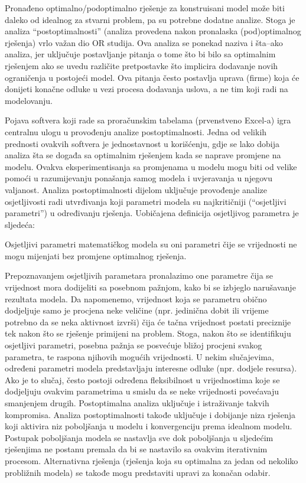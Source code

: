 \documentclass[a4paper, utf8, 11pt, colorlinks]{book}
\begin{document}
Pronađeno optimalno/podoptimalno rješenje za konstruisani model može biti daleko od idealnog za stvarni problem, pa su potrebne dodatne analize. Stoga je analiza ``postoptimalnosti'' (analiza provedena nakon pronalaska (pod)optimalnog rješenja) vrlo važan dio OR studija.  Ova analiza se ponekad naziva i šta--ako analiza, jer uključuje postavljanje pitanja o tome što bi bilo sa optimalnim rješenjem ako se uvedu različite pretpostavke što implicira dodavanje novih ograničenja u postojeći model. Ova pitanja često postavlja uprava (firme) koja će donijeti konačne odluke u vezi procesa dodavanja uslova, a ne tim koji radi na modelovanju.

Pojava softvera koji rade sa proračunskim tabelama (prvenstveno Excel-a) igra centralnu ulogu u provođenju analize postoptimalnosti. Jedna od velikih prednosti ovakvih softvera je jednostavnost u korišćenju, gdje se lako dobija analiza šta se događa sa optimalnim rješenjem kada se naprave promjene na modelu.  Ovakva eksperimentisanja sa promjenama u modelu mogu biti od velike pomoći u razumijevanju ponašanja samog modela i uvjeravanja u njegovu valjanost.  Analiza postoptimalnosti dijelom  uključuje provođenje analize osjetljivosti radi utvrđivanja koji parametri modela su najkritičniji (``osjetljivi parametri'') u određivanju rješenja. Uobičajena definicija osjetljivog parametra je sljedeća:

Osjetljivi parametri matematičkog modela su oni parametri čije se vrijednosti ne mogu mijenjati bez promjene optimalnog rješenja. 

Prepoznavanjem osjetljivih parametara pronalazimo one parametre čija se vrijednost mora dodijeliti sa posebnom pažnjom, kako bi se izbjeglo narušavanje rezultata modela. Da napomenemo, vrijednost koja se parametru obično dodjeljuje samo je procjena neke veličine
(npr. jedinična dobit ili vrijeme potrebno da se neka aktivnost izvrši) čija će tačna vrijednost postati preciznije tek nakon što se rješenje primijeni na problem. Stoga, nakon
što se identifikuju osjetljivi parametri, posebna pažnja se posvećuje bližoj procjeni svakog parametra, te  raspona njihovih mogućih vrijednosti.  U nekim slučajevima, određeni parametri modela predstavljaju interesne odluke (npr. dodjele resursa). Ako je to slučaj, često postoji određena fleksibilnost u vrijednostima koje se dodjeljuju ovakvim parametrima u smislu da se neke vrijednosti povećavaju  smanjenjem drugih. Postoptimalna analiza uključuje i istraživanje takvih kompromisa. Analiza postoptimalnosti takođe uključuje i dobijanje niza rješenja koji aktivira niz poboljšanja u modelu i konvergenciju prema idealnom modelu. Postupak poboljšanja modela se nastavlja sve dok    poboljšanja u sljedećim rješenjima ne postanu premala da bi se nastavilo sa ovakvim iterativnim procesom.   Alternativna rješenja (rješenja koja su optimalna za jedan od nekoliko probližnih modela) se takođe mogu predstaviti upravi za konačan odabir. 
\end{document}
